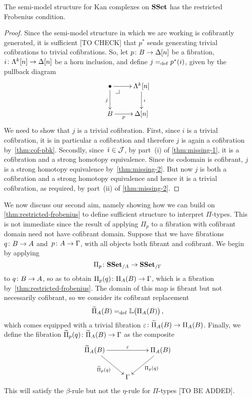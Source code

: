 \documentclass[reqno,10pt,a4paper,oneside,draft]{amsart}
\begin{document}
\begin{theorem} 
\label{thm:restricted-frobenius}
The semi-model structure for Kan complexes on $\SSet$ has the restricted Frobenius condition.
\end{theorem} 

\begin{proof}  Since the semi-model structure in which we 
are working is cofibrantly generated, it is sufficient [TO CHECK] that $p^*$ sends generating trivial cofibrations to trivial cofibrations. So, let $p \co B \to \Delta[n]$ be a fibration, $i \co \Lambda^k[n]
\to \Delta[n]$ be a horn inclusion, and define $ j \defeq p^*(i)$, given by 
the pullback diagram
\[
\xymatrix{
\bullet  \ar[r] \ar[d]_j \drpullback & \Lambda^k[n] \ar[d]^{i} \\
B \ar[r]_-{p} & \Delta[n] }
\]
We need to show that $j$ is a trivial cofibration.  
First, since $i$ is a trivial cofibration, it is in particular
a cofibration and therefore $j$ is again a cofibration by~\cref{thm:cof-pbk}. Secondly, since~$i \in \cal{J}$,
by part~(i) of \cref{thm:missing-1}, it is a cofibration and a strong homotopy equivalence. Since its codomain is cofibrant, $j$ is a strong homotopy equivalence by~\cref{thm:missing-2}.
But now $j$ is both a cofibration and a strong homotopy equivalence
and hence it is a trivial cofibration, as required, by part~(ii) of \cref{thm:missing-2}.
\end{proof} 


We now discuss our second aim, namely showing how we can build on \cref{thm:restricted-frobenius} 
to define sufficient structure to interpret $\Pi$-types. This is not immediate since the result of applying $\Pi_p$ to a 
fibration with cofibrant domain need not have cofibrant domain.
 Suppose that we have fibrations 
$q \co B \to A$ and~$p \co A \to \Gamma$, with
all objects both fibrant and cofibrant. 
We begin by applying 
\[
\Pi_p  \co \SSet_{/A} \to \SSet_{/\Gamma}
\]
to $q \co B \to A$, so as to obtain $\Pi_p(q) \co \Pi_A(B) \to \Gamma$, which is
a fibration by~\cref{thm:restricted-frobenius}. The domain of this map is fibrant but
not necessarily cofibrant, so we consider its cofibrant replacement 
\[
\widetilde{\Pi}_A(B) \defeq \mathbb{L} \big( \Pi_A(B)  \big) \, ,
\]
which comes equipped with a trivial fibration $\varepsilon \co \widetilde{\Pi}_A(B) \to \Pi_A(B)$.
Finally, we define the fibration $\widetilde{\Pi}_p(q) \co \widetilde{\Pi}_A(B) \to \Gamma$ as 
 the composite
 \[
\xymatrix{
\widetilde{\Pi}_A(B) \ar[rr]^{\varepsilon} \ar[dr]_{\widetilde{\Pi}_p(q) } & & \Pi_A(B) \ar[dl]^{\Pi_p(q)}  \\
 & \Gamma &} 
 \]
This will satisfy the $\beta$-rule but not the $\eta$-rule for $\Pi$-types [TO BE ADDED].
\end{document}
